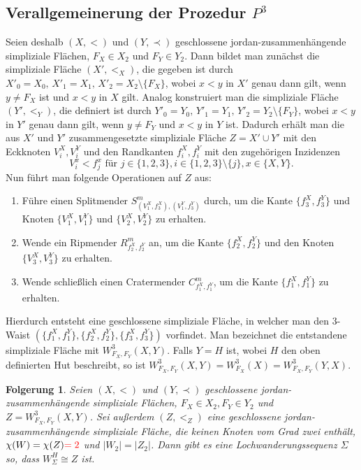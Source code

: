 \documentclass[12pt,titlepage]{article}
\newtheorem{folgerung}{Folgerung}[section]
\begin{document}
\subsection{Verallgemeinerung der Prozedur $P^3$}
Seien deshalb $(X,<)$ und $(Y,\prec)$ geschlossene jordan-zusammenhängende simpliziale Flächen, $F_X \in X_2$ und $F_Y \in Y_2$. Dann bildet man zunächst die simpliziale Fläche $(X',<_X)$, die  gegeben ist durch $X'_0=X_0,\,X'_1=X_1,\,X'_2=X_2\setminus \{F_X\}$, wobei $x<y$ in $X'$ genau dann gilt, wenn $y\neq F_X$ ist und $x<y$ in $X$ gilt. Analog konstruiert man die simpliziale Fläche $(Y',<_Y)$, die definiert ist durch $Y'_0=Y_0,\,Y'_1=Y_1,\,Y'_2=Y_2\setminus \{F_Y\}$, wobei $x<y$ in $Y'$ genau dann gilt, wenn $y\neq F_Y$ und $x<y$ in $Y$ ist.
Dadurch erhält man die aus $X'$ und $Y'$ zusammengesetzte simpliziale Fläche $Z=X' \cup Y'$ mit den Eckknoten $V_i^{X},V_i^{Y}$ und den Randkanten $f_i^{X},f_i^{Y}$ mit den zugehörigen Inzidenzen 
\[
V^x_i < f^x_j \text{ für } j\in \{1,2,3\},i\in\{1,2,3\}\setminus \{j\}, x\in \{X,Y\}.
\]
Nun führt man folgende Operationen auf $Z$ aus:
\begin{enumerate}
\item Führe einen Splitmender $S^m_{(V_1^X,f_3^X),(V_1^Y,f_3^Y)}$ durch, um die Kante $\{f_3^X,f_3^Y\}$ und Knoten $\{V_1^X,V_1^Y\}$ und $\{V_2^X,V_2^Y\}$ zu erhalten.
\item Wende ein Ripmender $R^m_{f_2^X, f_2^Y}$ an, um die Kante $\{f_2^X ,f_2^Y\}$ und den Knoten $\{V_3^X,V_3^Y\}$ zu erhalten. 
\item Wende schließlich einen Cratermender $C^m_{f_1^X,f_1^Y}$, um die Kante $\{f_1^X,f_1^Y\}$ zu erhalten.
\end{enumerate}
Hierdurch entsteht eine geschlossene simpliziale Fläche, in welcher man den 3-Waist $(\{f_1^X,f_1^Y\},\{f_2^X,f_2^Y\},\{f_3^X,f_3^Y\})$ vorfindet. Man bezeichnet die entstandene simpliziale Fläche mit $W^3_{F_X,F_Y}(X,Y)$. Falls $Y=H$ ist, wobei $H$ den oben definierten Hut beschreibt, so ist $W^3_{F_X,F_Y}(X,Y)=W^3_{F_X}(X)=W^3_{F_X,F_Y}(Y,X)$.
\begin{folgerung} 
Seien $(X,<)$ und $(Y, \prec)$ geschlossene jordan-zusammenhängende simpliziale Flächen, $F_X\in X_2 ,F_Y \in Y_2$ und $Z=W_{F_X,F_Y}^3(X,Y)$. Sei außerdem $(Z,<_Z)$ eine geschlossene jordan-zusammenhängende simpliziale Fläche, die keinen Knoten vom Grad zwei enthält, $\chi(W)=\chi(Z)\textcolor{red}{=2}$ und $\vert W_2 \vert=\vert Z_2\vert $. Dann gibt es eine Lochwanderungssequenz $\Sigma$ so, dass $W_{\Sigma}^H \cong Z$ ist. 
\end{folgerung} 
\end{document}
